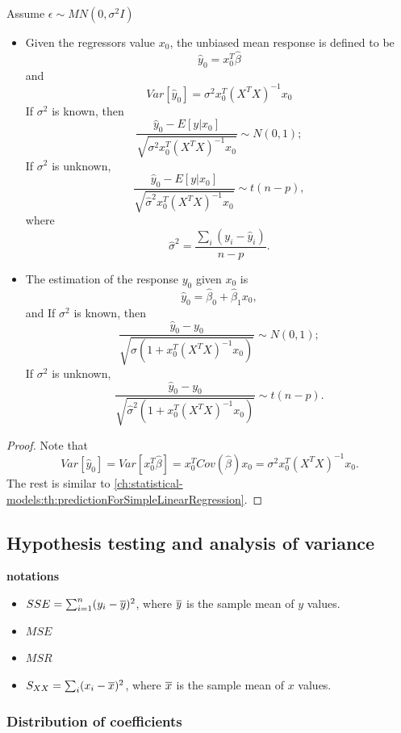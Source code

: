 \begin{refsection}
\begin{lemma}\cite[94,99]{montgomery2012introduction}
Assume $\epsilon\sim MN(0,\sigma^2 I)$
\begin{itemize}
	\item Given the regressors value $x_0$, the unbiased mean response is defined to be
$$\hat{y}_0=x_0^T\hat{\beta}$$
and
$$Var[\hat{y}_0] = \sigma^2x_0^T(X^TX)^{-1}x_0$$
	If $\sigma^2$ is known, then
$$\frac{\hat{y}_0 - E[y|x_0]}{\sqrt{\sigma^2 x_0^T(X^TX)^{-1}x_0}}\sim N(0,1);$$
	If $\sigma^2$ is unknown,
$$\frac{\hat{y}_0 - E[y|x_0]}{\sqrt{\hat{\sigma}^2 x_0^T(X^TX)^{-1}x_0}}\sim t(n-p),$$
where
	$$\hat{\sigma}^2 = \frac{\sum_i (y_i - \hat{y}_i)}{n-p}.$$

\item The estimation of the response $y_0$ given $x_0$ is
$$\hat{y}_0 = \hat{\beta}_0 + \hat{\beta}_1x_0,$$
and 
	If $\sigma^2$ is known, then
$$\frac{\hat{y}_0 -y_0}{\sqrt{\sigma (1+x_0^T(X^TX)^{-1}x_0)}}\sim N(0,1);$$
	If $\sigma^2$ is unknown,
$$\frac{\hat{y}_0 - y_0}{\sqrt{\hat{\sigma}^2 (1 + x_0^T(X^TX)^{-1}x_0)}}\sim t(n-p).$$
\end{itemize}
\end{lemma}
\begin{proof}
Note that	
$$Var[\hat{y}_0] = Var[x_0^T\hat{\beta}] = x_0^T Cov(\hat{\beta})x_0 =  \sigma^2x_0^T(X^TX)^{-1}x_0.$$
The rest is similar to \autoref{ch:statistical-models:th:predictionForSimpleLinearRegression}.
\end{proof}


\subsection{Hypothesis testing and analysis of variance}
\begin{mdframed}
	\textbf{notations}
	\begin{itemize}
		\item $SSE = \sum_{i=1}^n (y_i - \overline{y})^2$, where $\overline{y}$ is the sample mean of $y$ values.
		\item $MSE$
		\item $MSR$
		\item $S_{XX} = \sum_i (x_{i}-\overline{x})^2$, where $\overline{x}$ is the sample mean of $x$ values.
	\end{itemize}
\end{mdframed}

\subsubsection{Distribution of coefficients}


\end{refsection}
